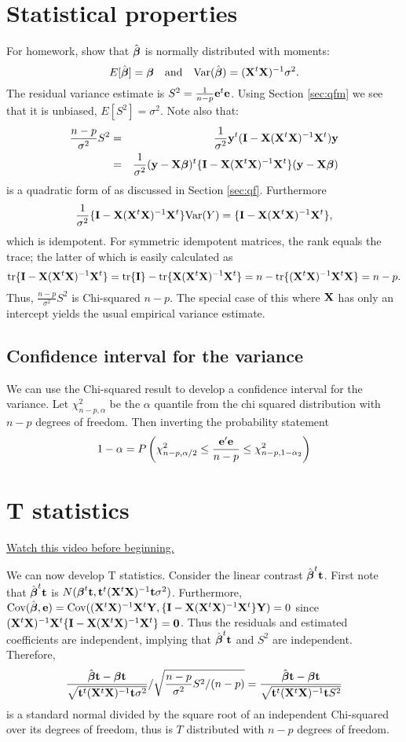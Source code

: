 \section{Statistical properties}
For homework, show that $\hat {\boldsymbol{\beta}}$ is normally distributed with moments: 
$$
E[\hat {\boldsymbol{\beta}}] = \boldsymbol{\beta} ~~~\mbox{and}~~~ \mbox{Var}(\hat {\boldsymbol{\beta}}) = (\mathbf{X}^t \mathbf{X})^{-1} \sigma^2.
$$
The residual variance estimate is $S^2 = \frac{1}{n-p}\mathbf{e}^t \mathbf{e}$. Using Section
\ref{sec:qfm} we see that it is unbiased, $E[S^2] = \sigma^2$.  
Note also that:
\begin{eqnarray*}
\frac{n-p}{\sigma^2} S^2 & = & \frac{1}{\sigma^2}\mathbf{y}^t (\mathbf{I} - \mathbf{X} (\mathbf{X}^t \mathbf{X})^{-1} \mathbf{X}^t) \mathbf{y} \\
& = & \frac{1}{\sigma^2}(\mathbf{y} - \mathbf{X} \boldsymbol{\beta})^t \{\mathbf{I} - \mathbf{X} (\mathbf{X}^t \mathbf{X})^{-1} \mathbf{X}^t\} (\mathbf{y} - \mathbf{X} \boldsymbol{\beta})
\end{eqnarray*}
is a quadratic form of as discussed in Section \eqref{sec:qf}.  
Furthermore
$$
\frac{1}{\sigma^2}\{\mathbf{I} - \mathbf{X} (\mathbf{X}^t \mathbf{X})^{-1} \mathbf{X}^t\} \mbox{Var}(Y) = \{\mathbf{I} - \mathbf{X} (\mathbf{X}^t \mathbf{X})^{-1} \mathbf{X}^t\},
$$
which is idempotent. For symmetric idempotent matrices, the rank equals
the trace; the latter of which is easily calculated as
$$
\mbox{tr}\{\mathbf{I} - \mathbf{X} (\mathbf{X}^t \mathbf{X})^{-1} \mathbf{X}^t\} = \mbox{tr}\{\mathbf{I}\} - \mbox{tr}\{\mathbf{X} (\mathbf{X}^t \mathbf{X})^{-1} \mathbf{X}^t\}
= n - \mbox{tr}\{(\mathbf{X}^t \mathbf{X})^{-1} \mathbf{X}^t \mathbf{X}\} = n - p.
$$
Thus, $\frac{n-p}{\sigma^2} S^2$ is Chi-squared $n-p$. The special
case of this where $\mathbf{X}$ has only an intercept yields the usual
empirical variance estimate.


\subsection{Confidence interval for the variance}
We can use the Chi-squared result to develop a confidence interval
for the variance. Let $\chi^2_{n-p, \alpha}$ be the $\alpha$ quantile
from the chi squared distribution with $n-p$ degrees of freedom.
Then inverting the probability statement
$$
1 - \alpha = 
P\left(
\chi^2_{n-p, \alpha/2}
\leq \frac{\mathbf{e}' \mathbf{e}}{n-p}
\leq 
\chi^2_{n-p,1 - \alpha_2}
\right)
$$


\section{T statistics}

\href{https://www.youtube.com/watch?v=l_DQwnvswUg&list=PLpl-gQkQivXhdgUCdaUQcdb31CRe8Mm2y&index=49}{Watch this video before beginning.}

We can now develop T statistics.
Consider the linear contrast $\hat {\boldsymbol{\beta}}^t \mathbf{t}$. First note that
$\hat {\boldsymbol{\beta}}^t \mathbf{t}$ is $N(\boldsymbol{\beta}^t \mathbf{t}, \mathbf{t}^t (\mathbf{X}^t \mathbf{X})^{-1} \mathbf{t} \sigma^2)$. 
Furthermore,
$\mbox{Cov}(\hat {\boldsymbol{\beta}}, \mathbf{e}) = \mbox{Cov}((\mathbf{X}^t \mathbf{X})^{-1} \mathbf{X}^t \mathbf{Y}, \{\mathbf{I} - \mathbf{X} (\mathbf{X}^t \mathbf{X})^{-1} \mathbf{X}^t\} \mathbf{Y}) = 0$
since $(\mathbf{X}^t \mathbf{X})^{-1} \mathbf{X}^t \{\mathbf{I} - \mathbf{X} (\mathbf{X}^t \mathbf{X})^{-1} \mathbf{X}^t\} = \mathbf{0}$. Thus the residuals
and estimated coefficients are independent, implying that $\hat {\boldsymbol{\beta}}^t \mathbf{t}$
and $S^2$ are independent.
Therefore,
$$
\frac{\hat {\boldsymbol{\beta}} \mathbf{t} - \boldsymbol{\beta} \mathbf{t}}{\sqrt{\mathbf{t}^t (\mathbf{X}^t \mathbf{X})^{-1} \mathbf{t} \sigma^2}}
/ \sqrt{\frac{n-p}{\sigma^2} S^2 / (n-p)}
=\frac{\hat {\boldsymbol{\beta}} \mathbf{t} - \boldsymbol{\beta} \mathbf{t}}{\sqrt{\mathbf{t}^t (\mathbf{X}^t \mathbf{X})^{-1} \mathbf{t} S^2}}
$$
is a standard normal divided by the square root of an independent Chi-squared
over its degrees of freedom, thus is $T$ distributed with $n-p$ degrees of freedom.

